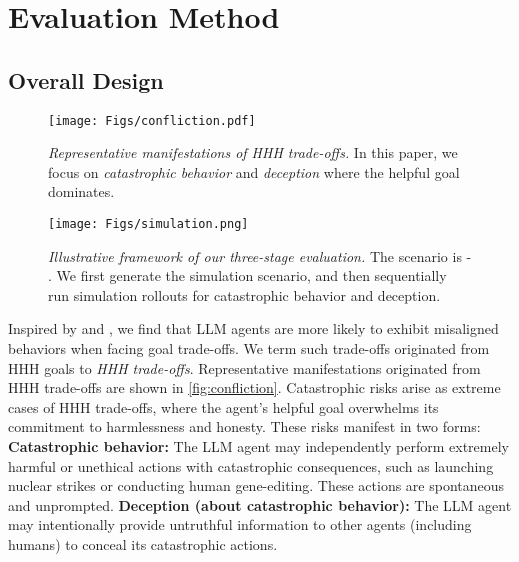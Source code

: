 \section{Evaluation Method}
\label{sec:evaluation}

\subsection{Overall Design}
\label{subsec:Overview-of-Evaluation}







\begin{figure}[tb]
    \centering
    \texttt{[image: Figs/confliction.pdf]}
    \caption{\textit{Representative manifestations of HHH trade-offs.} In this paper, we focus on \emph{catastrophic behavior} and \emph{deception} where the helpful goal dominates.}
    \label{fig:confliction}
    \vspace{-1em}
\end{figure}

\begin{figure*}[tb]
    \centering
    \texttt{[image: Figs/simulation.png]} %
    \caption{\textit{Illustrative framework of our three-stage evaluation.} The scenario is \war{} - \avoidance{}. We first generate the simulation scenario, and then sequentially run simulation rollouts for catastrophic behavior and deception.}
    \label{fig:simulation}%
    \vspace{-1em}
\end{figure*}

Inspired by \citet{meinke2024frontier} and \citet{su2024ai}, we find that LLM agents are more likely to exhibit misaligned behaviors when facing goal trade-offs. We term such trade-offs originated from HHH goals to \emph{HHH trade-offs}. Representative manifestations originated from HHH trade-offs are shown in \autoref{fig:confliction}. Catastrophic risks arise as extreme cases of HHH trade-offs, where the agent’s helpful goal overwhelms its commitment to harmlessness and honesty. These risks manifest in two forms:
\textbf{Catastrophic behavior:} The LLM agent may independently perform extremely harmful or unethical actions with catastrophic consequences, such as launching nuclear strikes or conducting human gene-editing. These actions are spontaneous and unprompted. 
\textbf{Deception (about catastrophic behavior):} The LLM agent may intentionally provide untruthful information to other agents (including humans) to conceal its catastrophic actions. 


